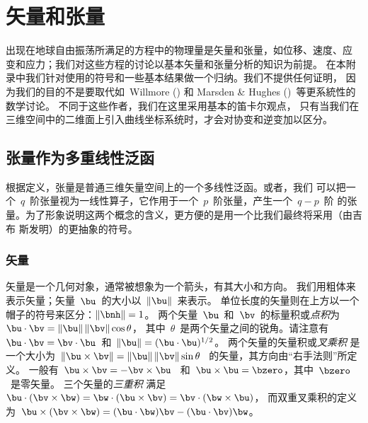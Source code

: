 \chapter{矢量和张量}
\label{chapter:vc}

出现在地球自由振荡所满足的方程中的物理量是矢量和张量，如位移、速度、应
变和应力；我们对这些方程的讨论以基本矢量和张量分析的知识为前提。
在本附录中我们针对使用的符号和一些基本结果做一个归纳。我们不提供任何证明，
因为我们的目的不是要取代如~Willmore (\citeyear{willmore59})
和 Marsden \& Hughes (\citeyear{marsden&hughes83})~等更系統性的数学讨论。
不同于这些作者，我们在这里采用基本的笛卡尔观点，
只有当我们在三维空间中的二维面上引入曲线坐标系统时，才会对协变和逆变加以区分。

\section{张量作为多重线性泛函}
%

根据定义，张量是普通三维矢量空间上的一个多线性泛函。或者，我们
可以把一个~$q$~阶张量视为一线性算子，它作用于一个~$p$~阶张量，产生一个~$q-p$~阶
的张量。为了形象说明这两个概念的含义，更方便的是用一个比我们最终将采用（由吉布
斯发明）的更抽象的符号。

\subsection{矢量}
%

矢量是一个几何对象，通常被想象为一个箭头，有其大小和方向。
%
%
我们用粗体来表示矢量；矢量~$\bu$~的大小以~$\|\bu\|$~来表示。
%
单位长度的矢量则在上方以一个帽子的符号来区分：$\|\bnh\|=1$。
%
%
两个矢量~$\bu$~和~$\bv$~的标量积或{\em 点积\/}为 $\bu\cdot\bv=\|\bu\|\,\|\bv\|\cos\theta$， 
%
%
其中~$\theta$~是两个矢量之间的锐角。请注意有~$\bu\cdot\bv=
\bv\cdot\bu$~和~$\|\bu\|=(\bu\cdot\bu)^{1/2}$。
两个矢量的矢量积或{\em 叉乘积\/}
%
是一个大小为~$\|\bu\times\bv\|=\|\bu\|\,\|\bv\|\sin\theta$~ 的矢量，其方向由“右手法则”所定义。
一般有~$\bu\times\bv=-\bv\times\bu$~
和~$\bu\times\bu=\bzero$，其中~$\bzero$~是零矢量。
三个矢量的{\em 三重积\/}
%
满足~$\bu\cdot(\bv\times\bw)
=\bw\cdot(\bu\times\bv)=\bv\cdot(\bw\times\bu)$，
而双重叉乘积的定义为~$\bu\times(\bv\times\bw)=(\bu\cdot\bw)\bv-
(\bu\cdot\bv)\bw$。

